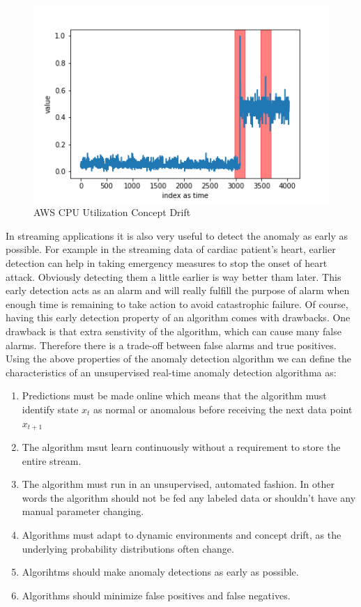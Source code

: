 \documentclass[12pt]{article}
\begin{document}
\begin{figure}[H]
\centering
        \includegraphics[width=\textwidth]{images/dataAnomalies/aws/rds_cpu_utilization_cc0c53.png}
    \caption{AWS CPU Utilization Concept Drift}
    \label{awsCpuUtilizationConceptDrift}
\end{figure}
In streaming applications it is also very useful to detect the anomaly as early as possible. For example in the streaming data of cardiac patient's heart, earlier detection can help in taking emergency measures to stop the onset of heart attack. Obviously detecting them a little earlier is way better tham later. This early detection acts as an alarm and will really fulfill the purpose of alarm when enough time is remaining to take action to avoid catastrophic failure. Of course, having this early detection property of an algorithm comes with drawbacks. One drawback is that extra senstivity of the algorithm, which can cause many false alarms. Therefore there is a trade-off between false alarms and  true positives. Using the above properties of the anomaly detection algorithm we can define the characteristics of an unsupervised real-time anomaly detection algorithma as:
\begin{enumerate}
\item Predictions must be made online which means that the algorithm must identify state $x_t$ as normal or anomalous before receiving the next data point $x_{t+1}$
\item The algorithm msut learn continuously without a requirement to store the entire stream. 
\item The algorithm must run in an unsupervised, automated fashion. In other words the algorithm should not be fed any labeled data or shouldn't have any manual parameter changing.
\item Algorithms must adapt to dynamic environments and concept drift, as the underlying probability distributions often change.
\item Algorihtms should make anomaly detections as early as possible.
\item Algorithms should minimize false positives and false negatives.
\end{enumerate}
\end{document}
